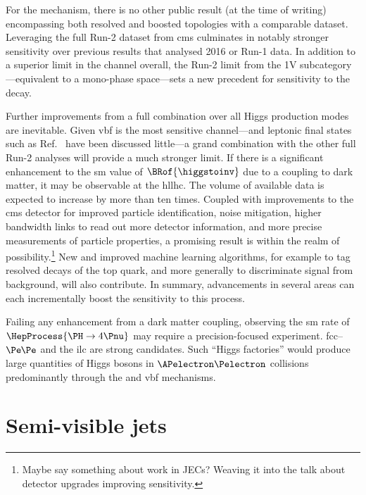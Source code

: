 For the \VH mechanism, there is no other public result (at the time of writing) encompassing both resolved and boosted topologies with a comparable dataset. Leveraging the full Run-2 dataset from \acrshort{cms} culminates in notably stronger sensitivity over previous results that analysed 2016 or Run-1 data. In addition to a superior limit in the \VH channel overall, the Run-2 limit from the 1V subcategory---equivalent to a mono-\PVec phase space---sets a new precedent for sensitivity to the \higgstoinv decay.

Further improvements from a full combination over all Higgs production modes are inevitable. Given \acrshort{vbf} is the most sensitive channel---and leptonic final states such as Ref.~ have been discussed little---a grand combination with the other full Run-2 analyses will provide a much stronger limit. If there is a significant enhancement to the \acrshort{sm} value of $\BRof{\higgstoinv}$ due to a coupling to dark matter, it may be observable at the \acrshort{hllhc}. The volume of available data is expected to increase by more than ten times. Coupled with improvements to the \acrshort{cms} detector for improved particle identification, noise mitigation, higher bandwidth links to read out more detector information, and more precise measurements of particle properties, a promising result is within the realm of possibility.\footnote{Maybe say something about work in JECs? Weaving it into the talk about detector upgrades improving sensitivity.} New and improved machine learning algorithms, for example to tag resolved decays of the top quark, and more generally to discriminate signal from background, will also contribute. In summary, advancements in several areas can each incrementally boost the sensitivity to this process.

Failing any enhancement from a dark matter coupling, observing the \acrshort{sm} rate of $\HepProcess{\PH \to \text{4}\Pnu}$ may require a precision-focused experiment. \acrshort{fcc}--$\Pe\mkern-1mu\Pe$ and the \acrshort{ilc} are strong candidates. Such ``Higgs factories'' would produce large quantities of Higgs bosons in $\APelectron \Pelectron$ collisions predominantly through the \VH and \acrshort{vbf} mechanisms.




\section{Semi-visible jets}
\label{sec:conclusions_svj}

